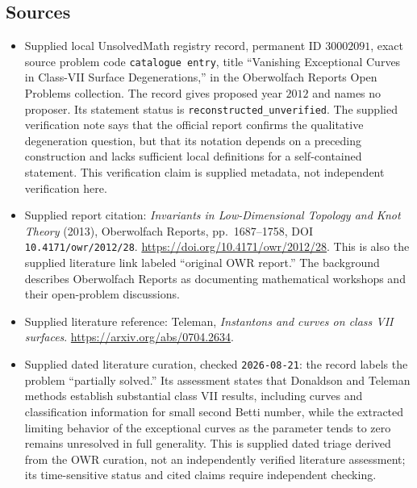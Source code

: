 \documentclass[11pt]{article}
\begin{document}
\subsection{Sources}
\begin{itemize}
\item Supplied local UnsolvedMath registry record, permanent ID \(30002091\), exact source problem code \texttt{catalogue entry}, title ``Vanishing Exceptional Curves in Class-VII Surface Degenerations,'' in the Oberwolfach Reports Open Problems collection. The record gives proposed year \(2012\) and names no proposer. Its statement status is \texttt{reconstructed\_unverified}. The supplied verification note says that the official report confirms the qualitative degeneration question, but that its notation depends on a preceding construction and lacks sufficient local definitions for a self-contained statement. This verification claim is supplied metadata, not independent verification here.
\item Supplied report citation: \emph{Invariants in Low-Dimensional Topology and Knot Theory} (2013), Oberwolfach Reports, pp.~1687--1758, DOI \texttt{10.4171/owr/2012/28}. \url{https://doi.org/10.4171/owr/2012/28}. This is also the supplied literature link labeled ``original OWR report.'' The background describes Oberwolfach Reports as documenting mathematical workshops and their open-problem discussions.
\item Supplied literature reference: Teleman, \emph{Instantons and curves on class VII surfaces}. \url{https://arxiv.org/abs/0704.2634}.
\item Supplied dated literature curation, checked \texttt{2026-08-21}: the record labels the problem ``partially solved.'' Its assessment states that Donaldson and Teleman methods establish substantial class VII results, including curves and classification information for small second Betti number, while the extracted limiting behavior of the exceptional curves as the parameter tends to zero remains unresolved in full generality. This is supplied dated triage derived from the OWR curation, not an independently verified literature assessment; its time-sensitive status and cited claims require independent checking.
\end{itemize}
\end{document}
